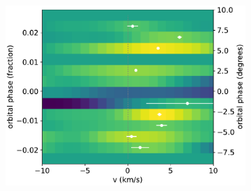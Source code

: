 \documentclass[twocolumn]{aastex631}
\begin{document}
\begin{figure}[ht!]
\begin{subfigure}[b]{0.333\textwidth}
            \label{fig:1d-ccf-Fe+-combined}
        \end{subfigure}
        \begin{subfigure}[b]{0.333\textwidth}
            \includegraphics[width=\textwidth]{plots-updated/line-velocity/binned/pcolor/points/KELT-20b.Fe+.phase-binned+RVs.pdf}
            \label{fig:wind-chars-Fe+-combined}
        \end{subfigure}


\end{figure}
\end{document}
